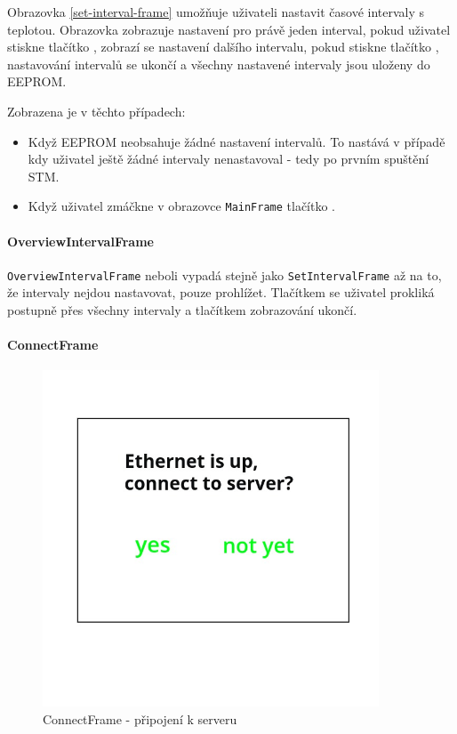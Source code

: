 Obrazovka \ref{set-interval-frame} umožňuje uživateli nastavit časové intervaly s teplotou.
Obrazovka zobrazuje nastavení pro právě jeden interval, pokud uživatel stiskne tlačítko
, zobrazí se nastavení dalšího intervalu, pokud stiskne tlačítko , nastavování
intervalů se ukončí a všechny nastavené intervaly jsou uloženy do EEPROM.

Zobrazena je v těchto případech:
\begin{itemize}
  \item Když EEPROM neobsahuje žádné nastavení intervalů. To nastává v případě kdy uživatel
    ještě žádné intervaly nenastavoval - tedy po prvním spuštění STM.
  \item Když uživatel zmáčkne v obrazovce \texttt{MainFrame} tlačítko .
\end{itemize}

\paragraph{OverviewIntervalFrame}
\texttt{OverviewIntervalFrame} neboli  vypadá stejně
jako \texttt{SetIntervalFrame} až na to, že intervaly nejdou nastavovat, pouze prohlížet.
Tlačítkem  se uživatel prokliká postupně přes všechny intervaly a tlačítkem  zobrazování
ukončí.

\paragraph{ConnectFrame}
\begin{figure}[H]\centering
\includegraphics[width=100mm, height=100mm]{../img/connect_frame.jpg}
\caption{ConnectFrame - připojení k serveru}
\label{connect-frame}
\end{figure}

